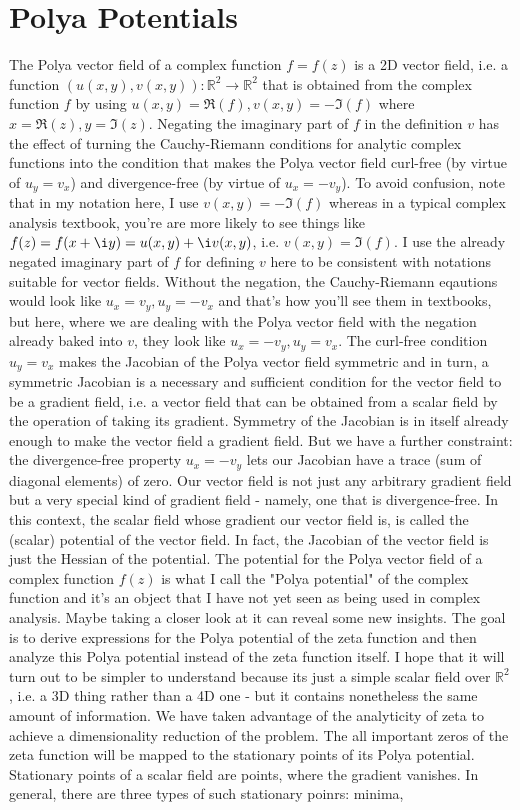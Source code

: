 \documentclass[12pt]{article}
\begin{document}
\section{Polya Potentials}
The Polya vector field of a complex function $f = f(z)$ is a 2D vector field, i.e. a function $(u(x,y), v(x,y)): \mathbb{R}^2 \rightarrow \mathbb{R}^2$ that is obtained from the complex function $f$ by using $u(x,y) = \Re(f), v(x,y) = -\Im(f)$ where $x = \Re(z), y = \Im(z)$. Negating the imaginary part of $f$ in the definition $v$ has the effect of turning the Cauchy-Riemann conditions for analytic complex functions into the condition that makes the Polya vector field curl-free (by virtue of $u_y = v_x$) and divergence-free (by virtue of $u_x = - v_y$). To avoid confusion, note that in my notation here, I use $v(x,y) = -\Im(f)$ whereas in a typical complex analysis textbook, you're are more likely to see things like $f(z) = f(x + \i y) = u(x,y) + \i v(x,y)$, i.e. $v(x,y) = \Im(f)$. I use the already negated imaginary part of $f$ for defining $v$ here to be consistent with notations suitable for vector fields. Without the negation, the Cauchy-Riemann eqautions would look like $u_x = v_y, u_y = -v_x$ and that's how you'll see them in textbooks, but here, where we are dealing with the Polya vector field with the negation already baked into $v$, they look like $u_x = -v_y, u_y = v_x$. The curl-free condition $u_y = v_x$ makes the Jacobian of the Polya vector field symmetric and in turn, a symmetric Jacobian is a necessary and sufficient condition for the vector field to be a gradient field, i.e. a vector field that can be obtained from a scalar field by the operation of taking its gradient. Symmetry of the Jacobian is in itself already enough to make the vector field a gradient field. But we have a further constraint: the divergence-free property $u_x = -v_y$ lets our Jacobian have a trace (sum of diagonal elements) of zero. Our vector field is not just any arbitrary gradient field but a very special kind of gradient field - namely, one that is divergence-free. In this context, the scalar field whose gradient our vector field is, is called the (scalar) potential of the vector field. In fact, the Jacobian of the vector field is just the Hessian of the potential. The potential for the Polya vector field of a complex function $f(z)$ is what I call the "Polya potential" of the complex function and it's an object that I have not yet seen as being used in complex analysis. Maybe taking a closer look at it can reveal some new insights. The goal is to derive expressions for the Polya potential of the zeta function and then analyze this Polya potential instead of the zeta function itself. I hope that it will turn out to be simpler to understand because its just a simple scalar field over $\mathbb{R}^2$, i.e. a 3D thing rather than a 4D one - but it contains nonetheless the same amount of information. We have taken advantage of the analyticity of zeta to achieve a dimensionality reduction of the problem. The all important zeros of the zeta function will be mapped to the stationary points of its Polya potential. Stationary points of a scalar field are points, where the gradient vanishes. In general, there are three types of such stationary poinrs: minima, 
\end{document}
